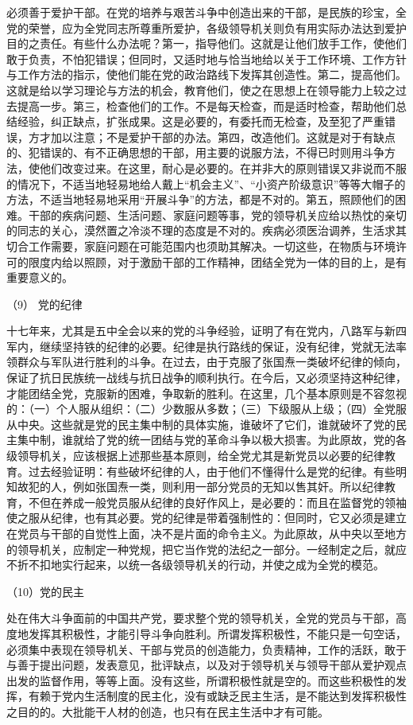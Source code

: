 \documentclass[UTF8, 12pt, a4paper]{ctexrep}
\begin{document}
必须善于爱护干部。在党的培养与艰苦斗争中创造出来的干部，是民族的珍宝，全党的荣誉，应为全党同志所尊重所爱护，各级领导机关则负有用实际办法达到爱护目的之责任。有些什么办法呢？第一，指导他们。这就是让他们放手工作，使他们敢于负责，不怕犯错误；但同时，又适时地与恰当地给以关于工作环境、工作方针与工作方法的指示，使他们能在党的政治路线下发挥其创造性。第二，提高他们。这就是给以学习理论与方法的机会，教育他们，使之在思想上在领导能力上较之过去提高一步。第三，检查他们的工作。不是每天检查，而是适时检查，帮助他们总结经验，纠正缺点，扩张成果。这是必要的，有委托而无检查，及至犯了严重错误，方才加以注意；不是爱护干部的办法。第四，改造他们。这就是对于有缺点的、犯错误的、有不正确思想的干部，用主要的说服方法，不得已时则用斗争方法，使他们改变过来。在这里，耐心是必要的。在并非大的原则错误又非说而不服的情况下，不适当地轻易地给人戴上“机会主义”、“小资产阶级意识”等等大帽子的方法，不适当地轻易地采用“开展斗争”的方法，都是不对的。第五，照顾他们的困难。干部的疾病问题、生活问题、家庭问题等事，党的领导机关应给以热忱的亲切的同志的关心，漠然置之冷淡不理的态度是不对的。疾病必须医治调养，生活求其切合工作需要，家庭问题在可能范围内也须助其解决。一切这些，在物质与环境许可的限度内给以照顾，对于激励干部的工作精神，团结全党为一体的目的上，是有重要意义的。

（9） 党的纪律

十七年来，尤其是五中全会以来的党的斗争经验，证明了有在党内，八路军与新四军内，继续坚持铁的纪律的必要。纪律是执行路线的保证，没有纪律，党就无法率领群众与军队进行胜利的斗争。在过去，由于克服了张国焘一类破坏纪律的倾向，保证了抗日民族统一战线与抗日战争的顺利执行。在今后，又必须坚持这种纪律，才能团结全党，克服新的困难，争取新的胜利。在这里，几个基本原则是不容忽视的：（一）个人服从组织：（二）少数服从多数；（三）下级服从上级；（四）全党服从中央。这些就是党的民主集中制的具体实施，谁破坏了它们，谁就破坏了党的民主集中制，谁就给了党的统一团结与党的革命斗争以极大损害。为此原故，党的各级领导机关，应该根据上述那些基本原则，给全党尤其是新党员以必要的纪律教育。过去经验证明：有些破坏纪律的人，由于他们不懂得什么是党的纪律。有些明知故犯的人，例如张国焘一类，则利用一部分党员的无知以售其奸。所以纪律教育，不但在养成一般党员服从纪律的良好作风上，是必要的：而且在监督党的领袖使之服从纪律，也有其必要。党的纪律是带着强制性的：但同时，它又必须是建立在党员与干部的自觉性上面，决不是片面的命令主义。为此原故，从中央以至地方的领导机关，应制定一种党规，把它当作党的法纪之一部分。一经制定之后，就应不折不扣地实行起来，以统一各级领导机关的行动，并使之成为全党的模范。

（10）党的民主

处在伟大斗争面前的中国共产党，要求整个党的领导机关，全党的党员与干部，高度地发挥其积极性，才能引导斗争向胜利。所谓发挥积极性，不能只是一句空话，必须集中表现在领导机关、干部与党员的创造能力，负责精神，工作的活跃，敢于与善于提出问题，发表意见，批评缺点，以及对于领导机关与领导干部从爱护观点出发的监督作用，等等上面。没有这些，所谓积极性就是空的。而这些积极性的发挥，有赖于党内生活制度的民主化，没有或缺乏民主生活，是不能达到发挥积极性之目的的。大批能干人材的创造，也只有在民主生活中才有可能。
\end{document}
